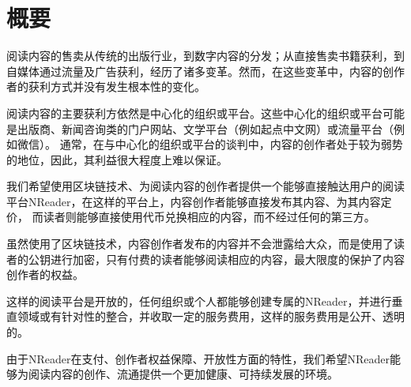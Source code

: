 \section{概要}
阅读内容的售卖从传统的出版行业，到数字内容的分发；从直接售卖书籍获利，到自媒体通过流量及广告获利，经历了诸多变革。然而，在这些变革中，内容的创作者的获利方式并没有发生根本性的变化。

阅读内容的主要获利方依然是中心化的组织或平台。这些中心化的组织或平台可能是出版商、新闻咨询类的门户网站、文学平台（例如起点中文网）或流量平台（例如微信）。
通常，在与中心化的组织或平台的谈判中，内容的创作者处于较为弱势的地位，因此，其利益很大程度上难以保证。


我们希望使用区块链技术、为阅读内容的创作者提供一个能够直接触达用户的阅读平台NReader，在这样的平台上，内容创作者能够直接发布其内容、为其内容定价，
而读者则能够直接使用代币兑换相应的内容，而不经过任何的第三方。

虽然使用了区块链技术，内容创作者发布的内容并不会泄露给大众，而是使用了读者的公钥进行加密，只有付费的读者能够阅读相应的内容，最大限度的保护了内容创作者的权益。

这样的阅读平台是开放的，任何组织或个人都能够创建专属的NReader，并进行垂直领域或有针对性的整合，并收取一定的服务费用，这样的服务费用是公开、透明的。

由于NReader在支付、创作者权益保障、开放性方面的特性，我们希望NReader能够为阅读内容的创作、流通提供一个更加健康、可持续发展的环境。

